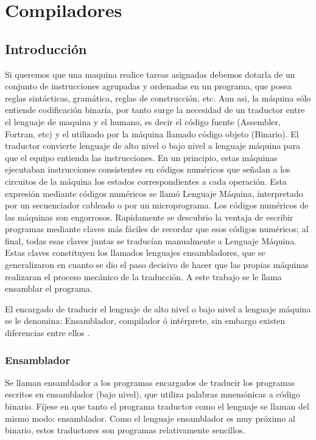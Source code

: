 
\chapter{Compiladores}

\section{Introducción}

Si queremos que una maquina realice tareas asignadas debemos dotarla de un conjunto de instrucciones agrupadas y ordenadas en un programa, que posea reglas sintácticas, gramática, reglas de construcción, etc. Aun asi, la máquina sólo entiende codificación binaría, por tanto surge la necesidad de un traductor entre el lenguaje de maquina y el humano, es decir el código fuente (Assembler, Fortran, etc) y el utilizado por la máquina llamado código objeto (Binario). El traductor convierte lenguaje de alto nivel o bajo nivel a lenguaje máquina para que el equipo entienda las instrucciones.
En un principio, estas máquinas ejecutaban instrucciones consistentes en códigos numéricos que señalan a los circuitos de la máquina los estados correspondientes a cada operación. Esta expresión mediante códigos numéricos se llamó Lenguaje Máquina, interpretado por un secuenciador cableado o por un microprograma. Los códigos numéricos de las máquinas son engorrosos. Rapidamente se descubrio la ventaja de escribir programas mediante claves más fáciles de recordar que esos códigos numéricos; al final, todas esas claves juntas se traducían manualmente a Lenguaje Máquina. Estas claves constituyen los llamados lenguajes ensambladores, que se generalizaron en cuanto se dio el paso decisivo de hacer que las propias máquinas realizaran el proceso mecánico de la traducción. A este trabajo se le llama ensamblar el programa.

El encargado de traducir el lenguaje de alto nivel o bajo nivel a lenguaje máquina se le denomina: Ensamblador, compilador ó intérprete, sin embargo existen diferencias entre ellos \cite{CompJFMM}.

\subsection{Ensamblador}
                                                      
Se llaman ensamblador a los programas encargados de traducir los programas escritos en ensamblador (bajo nivel), que utiliza palabras mnemónicas a código binario. 
Fíjese en que tanto el programa traductor como el lenguaje se llaman del mismo modo: ensamblador.
Como el lenguaje ensamblador es muy próximo al binario, estos traductores son programas relativamente sencillos.

